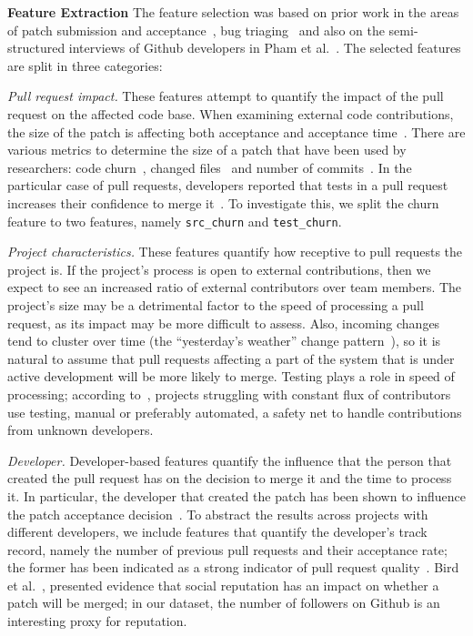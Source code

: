 \documentclass{sig-alternate}
\begin{document}
\textbf{Feature Extraction} The feature selection was based on prior work in the areas of patch submission
and acceptance~\cite{Nagap05,Bird07a,Weiss08,Baysa12}, bug
triaging~\cite{Anvik06, Giger10} and also on the semi-structured interviews of
Github developers in Pham et al.~\cite{Pham13}. The selected features are split
in three categories:

  \emph{Pull request impact.} These
    features attempt to quantify the impact of the
    pull request on the affected code base. When examining external code
    contributions, the size of the patch is affecting both acceptance and
    acceptance time~\cite{Weiss08}. There are various metrics to determine the
    size of a patch that have been used by researchers: code
    churn~\cite{Nagap05, Ratzi07}, changed files~\cite{Nagap05} and number of
    commits~\cite{Fluri07}. In the particular case of pull requests, developers
    reported that tests in a pull request increases their confidence to merge
    it~\cite{Pham13}. To investigate this, we split the churn feature to two
    features, namely \texttt{src\_churn} and \texttt{test\_churn}.

  \emph{Project characteristics.} These features quantify how receptive to pull
  requests the project is. If the project's process is open to external
  contributions, then we expect to see an increased ratio of external
  contributors over team members. The project's size may be a detrimental factor
  to the speed of processing a pull request, as its impact may be more difficult
  to assess. Also, incoming changes tend to cluster over time (the
  ``yesterday's weather'' change pattern~\cite{Girba04}), so it is natural to
  assume that pull requests affecting a part of the system that is under active
  development will be more likely to merge. Testing plays a role in speed of
  processing; according to~\cite{Pham13}, projects struggling with constant flux
  of contributors use testing, manual or preferably automated, a safety net to
  handle contributions from unknown developers.

  \emph{Developer.}  
    Developer-based features quantify the influence that the person that
    created the pull request has on the decision to merge it and
    the time to process it. In particular, the developer that created the patch
    has been shown to influence the patch acceptance decision~\cite{Jeong09}. To
    abstract the results across projects with different developers, we
    include features that quantify the developer's track record, namely the
    number of previous pull requests and their acceptance rate; the former has
    been indicated as a strong indicator of pull request quality~\cite{Pham13}.
    Bird et al.~\cite{Bird07}, presented evidence that social
    reputation has an impact on whether a patch will be merged; in our dataset,
    the number of followers on Github is an interesting proxy for
    reputation.
\end{document}
